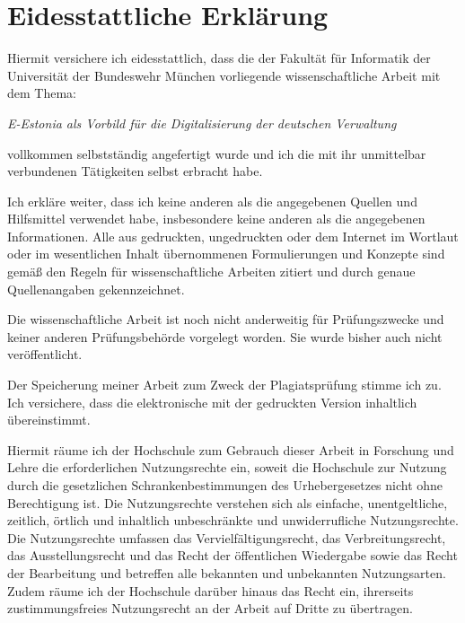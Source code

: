 
\chapter*{Eidesstattliche Erklärung}
{}
\thispagestyle{empty}

Hiermit versichere ich eidesstattlich, dass die der Fakultät für Informatik der Universität der Bundeswehr München vorliegende wissenschaftliche Arbeit mit dem Thema:

\begin{center}
  \textit{E-Estonia als Vorbild für die Digitalisierung der deutschen Verwaltung} 
\end{center}

vollkommen selbstständig angefertigt wurde und ich die mit ihr unmittelbar verbundenen Tätigkeiten selbst erbracht habe.

Ich erkläre weiter, dass ich keine anderen als die angegebenen Quellen und Hilfsmittel verwendet habe, insbesondere keine anderen als die angegebenen Informationen. Alle aus gedruckten, ungedruckten oder dem Internet im Wortlaut oder im wesentlichen Inhalt übernommenen Formulierungen und Konzepte sind gemäß den Regeln für wissenschaftliche Arbeiten zitiert und durch genaue Quellenangaben gekennzeichnet.

Die wissenschaftliche Arbeit ist noch nicht anderweitig für Prüfungszwecke und keiner anderen Prüfungsbehörde vorgelegt worden. Sie wurde bisher auch nicht veröffentlicht.

Der Speicherung meiner Arbeit zum Zweck der Plagiatsprüfung stimme ich zu. Ich versichere, dass die elektronische mit der gedruckten Version inhaltlich übereinstimmt.

Hiermit räume ich der Hochschule zum Gebrauch dieser Arbeit in Forschung und Lehre die erforderlichen Nutzungsrechte ein, soweit die Hochschule zur Nutzung durch die gesetzlichen Schrankenbestimmungen des Urhebergesetzes nicht ohne Berechtigung ist. Die Nutzungsrechte verstehen sich als einfache, unentgeltliche, zeitlich, örtlich und inhaltlich unbeschränkte und unwiderrufliche Nutzungsrechte. Die Nutzungsrechte umfassen das Vervielfältigungsrecht, das Verbreitungsrecht, das Ausstellungsrecht und das Recht der öffentlichen Wiedergabe sowie das Recht der Bearbeitung und betreffen alle bekannten und unbekannten Nutzungsarten. Zudem räume ich der Hochschule darüber hinaus das Recht ein, ihrerseits zustimmungsfreies Nutzungsrecht an der Arbeit auf Dritte zu übertragen.


